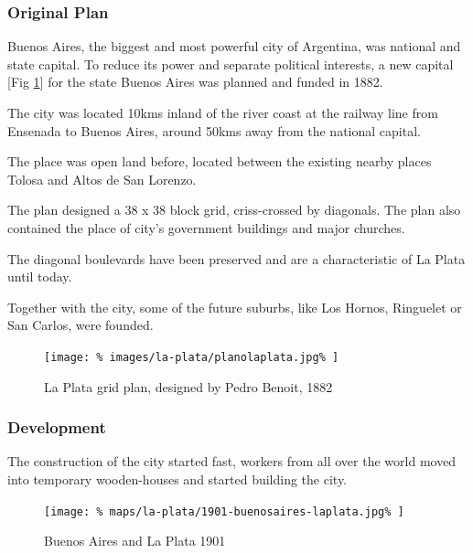 \documentclass{article}
\begin{document}
		\begin{multicols}{2}
      		\raggedcolumns
			
			\subsubsection{Original Plan}
			Buenos Aires, the biggest and most powerful city of Argentina, was national and state capital. To reduce its power and separate political interests, a new capital [Fig \ref{fig:img:plan-la-plata-1882}] for the state Buenos Aires was planned and funded in 1882.
			
			The city was located 10kms inland of the river coast at the railway line from Ensenada to Buenos Aires, around 50kms away from the national capital.
			
			The place was open land before, located between the existing nearby places Tolosa and Altos de San Lorenzo.
			
			
			The plan designed a 38 x 38 block grid, criss-crossed by diagonals. The plan also contained the place of city’s government buildings and major churches.
			
			The diagonal boulevards have been preserved and are a characteristic of La Plata until today.
			
			Together with the city, some of the future suburbs, like Los Hornos, Ringuelet or San Carlos, were founded.
			
			
			\begin{figure}[H]
				\texttt{[image: \%
					images/la-plata/planolaplata.jpg\%
				]}
				\caption{La Plata grid plan, designed by Pedro Benoit, 1882  \cite{RecoletaCemetery:PedroBenoit}}
				\label{fig:img:plan-la-plata-1882}
			\end{figure}
			
			
			
			\newpage
			\subsubsection{Development}
			
			The construction of the city started fast, workers from all over the world moved into temporary wooden-houses and started building the city.			
			
			\begin{figure}[H]
				\texttt{[image: \%
					maps/la-plata/1901-buenosaires-laplata.jpg\%
				]}
				\caption{Buenos Aires and La Plata 1901  \cite{RiviereDeLaPlata}}
				\label{fig:map:buenosaires-la-plata-1901}
			\end{figure}
			

\end{multicols}
\end{document}
